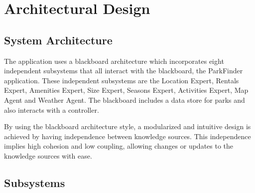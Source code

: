 \documentclass[titlepage,12pt]{article}
\begin{document}
\section{Architectural Design}
\label{sec:architectural_design}


\subsection{System Architecture}
\label{sub:system_architecture}

The application uses a blackboard architecture which incorporates eight independent subsystems that all interact with the blackboard, the ParkFinder application. These independent subsystems are the Location Expert, Rentals Expert, Amenities Expert, Size Expert, Seasons Expert, Activities Expert, Map Agent and Weather Agent. The blackboard includes a data store for parks and also interacts with a controller.\newline 

By using the blackboard architecture style, a modularized and intuitive design is achieved by having independence between knowledge sources. This independence implies high cohesion and low coupling, allowing changes or updates to the knowledge sources with ease. 



\subsection{Subsystems}
\label{sub:subsystems}
\end{document}
